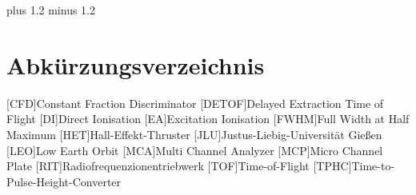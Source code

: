 \documentclass[fontsize=11pt,%
twoside,
BCOR          = 8mm]{scrreprt}
\author{Lorenz Saalmann}
\begin{document}
\font plus 1.2\font
minus 1.2\font






\cleardoublepage

\tableofcontents
\cleardoublepage

\listoffigures
\clearpage
\listoftables
\clearpage
\section*{\Large Abkürzungsverzeichnis}
\begin{acronym}
  [CFD]{\dotfill Constant Fraction Discriminator}  
  [DETOF]{\dotfill Delayed Extraction Time of Flight}
  [DI]{\dotfill Direct Ionisation}  
  [EA]{\dotfill Excitation Ionisation}  
  [FWHM]{\dotfill Full Width at Half Maximum}  
  [HET]{\dotfill Hall-Effekt-Thruster}  
  [JLU]{\dotfill Justus-Liebig-Universit\"{a}t Gie{\ss}en}  
  [LEO]{\dotfill Low Earth Orbit}  
  [MCA]{\dotfill Multi Channel Analyzer}  
  [MCP]{\dotfill Micro Channel Plate}  
  [RIT]{\dotfill Radiofrequenzionentriebwerk}  
  [TOF]{\dotfill Time-of-Flight}  
  [TPHC]{\dotfill Time-to-Pulse-Height-Converter}  


\end{acronym}
\cleardoublepage

\onehalfspacing

\cleardoublepage


\cleardoublepage

\cleardoublepage

\cleardoublepage

\cleardoublepage

\clearpage

\cleardoublepage
\renewcommand\bibname{Literaturverzeichnis}
{}
\printbibliography
\cleardoublepage


\fontsize{12pt}{12pt}\selectfont
\end{document}
